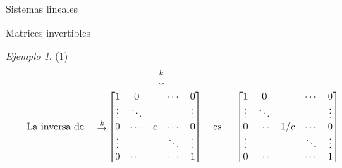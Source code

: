 \documentclass[a4paper,12pt,twoside,spanish,reqno]{amsbook}
\numberwithin{equation}{section}
\theoremstyle{definition}
\theoremstyle{remark}
\newtheorem*{ejemplo*}{Ejemplo}
\begin{document}
\begin{chapter}{Sistemas lineales}
\begin{section}{Matrices invertibles}
\begin{ejemplo*}
            (1) 
            \begin{align*}
            &\begin{matrix}
            {}^{}&{}^{}&{}^{}&{}^{}&{}^{}&\overset{k}{\downarrow}&{}^{}&{}^{}&{}^{}
            \end{matrix} \\
            \text{La inversa de \quad}\begin{matrix}
            {}^{}\\
            {}^{}\\
            \overset{k}{\to}\\
            {}^{}\\
            {}^{}
            \end{matrix}
            &\begin{bmatrix}
            1 & 0 &  &\cdots & 0  \\
            \vdots  & \ddots  & & & \vdots \\
            0 & \cdots &c &\cdots &0 \\
            \vdots  &   & &\ddots & \vdots \\
            0  & \cdots  & &\cdots & 1
            \end{bmatrix}
            \text{\quad es \quad}
            \begin{bmatrix}
            1 & 0 &  &\cdots & 0  \\
            \vdots  & \ddots  & & & \vdots \\
            0 & \cdots &1/c &\cdots &0 \\
            \vdots  &   & &\ddots & \vdots \\
            0  & \cdots  & &\cdots & 1
            \end{bmatrix}
            \end{align*}
            

\end{ejemplo*}
\end{section}
\end{chapter}
\end{document}
